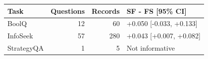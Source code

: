 \begin{tabular}{lrrl}
\toprule
Task & Questions & Records & SF - FS [95\% CI] \\
\midrule
BoolQ & 12 & 60 & +0.050 [-0.033, +0.133] \\
InfoSeek & 57 & 280 & +0.043 [+0.007, +0.082] \\
StrategyQA & 1 & 5 & Not informative \\
\bottomrule
\end{tabular}
